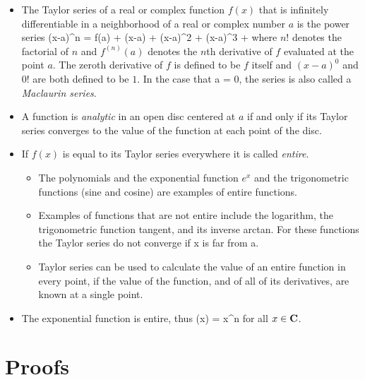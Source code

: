 \begin{itemize}
	\item The Taylor series of a real or complex function $f(x)$ that is
	infinitely differentiable in a neighborhood of a real or complex number $a$
	is the power series
		\sumnztoi {} (x-a)^n
		=
		f(a)
		+  (x-a)
		+  (x-a)^2
		+  (x-a)^3
		+ \cdots
	\eeql
	where $n!$ denotes the factorial of $n$ and
	$f^{(n)}(a)$ denotes the $n$th derivative of $f$ evaluated at the point $a$.
	The zeroth derivative of $f$ is defined to be $f$ itself and
	$(x - a)^0$ and $0!$ are both defined to be $1$.
	In the case that a = 0, the series is also called a \emph{Maclaurin series}.

	\item A function is \emph{analytic} in an open disc centered at $a$
	if and only if its Taylor series converges to the value of the function
	at each point of the disc.

	\item If $f(x)$ is equal to its Taylor series everywhere
	it is called \emph{entire}.
	\begin{itemize}
		\item The polynomials and the exponential function $e^x$ and
		the trigonometric functions (sine and cosine)
		are examples of entire functions.
		\item Examples of functions that are not entire include the logarithm,
		the trigonometric function tangent,
		and its inverse arctan.
		For these functions the Taylor series do not converge if x is far from a.
		\item Taylor series can be used to calculate the value of an entire function
		in every point, if the value of the function,
		and of all of its derivatives, are known at a single point.
	\end{itemize}

	\item The exponential function is entire,
	thus
		\exp(x) = \sumnztoi {} x^n
	\eeql
	for all $x\in{\mbox{\bf C}}$.
\end{itemize}


\chapter{Proofs}
\label{app-proofs}

